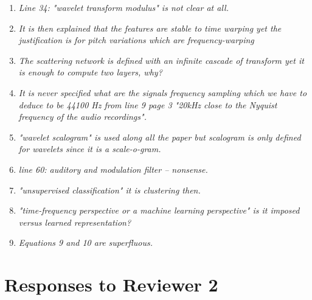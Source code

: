 \documentclass[10pt]{article}
\begin{document}
\begin{enumerate}
\item \emph{Line 34: "wavelet transform modulus" is not clear at all.}

\item \emph{It is then explained that the features are stable to time warping yet the justification is for pitch variations which are frequency-warping}

\item \emph{The scattering network is defined with an infinite cascade of transform yet it is enough to compute two layers, why?}

\item \emph{It is never specified what are the signals frequency sampling which we have to deduce to be 44100 Hz from line 9 page 3 "20kHz close to the Nyquist frequency of the audio recordings".}

\item \emph{"wavelet scalogram" is used along all the paper but scalogram is only defined for wavelets since 
it is a scale-o-gram.}

\item \emph{line 60: auditory and modulation filter – nonsense.}

\item \emph{"unsupervised classification" it is clustering then.}

\item \emph{"time-frequency perspective or a machine learning perspective" is it imposed versus learned representation? }

\item \emph{Equations 9 and 10 are superfluous.}

\end{enumerate}

\section{Responses to Reviewer 2}
\end{document}
